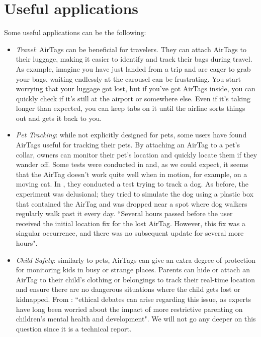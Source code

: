 \documentclass[english]{article}
\begin{document}
\section{Useful applications}\label{appl}
Some useful applications can be the following:
\begin{itemize}
  \item \textit{Travel}: AirTags can be beneficial for travelers. They can attach AirTags to their luggage, making it easier to identify and track their bags during travel. As example, 
  imagine you have just landed from a trip and are eager to grab your bags, waiting endlessly at the carousel can be frustrating. You start worrying that your luggage got lost, but if you've got AirTags inside, you can quickly check if it's still at the airport or somewhere else. Even if it's taking longer than expected, you can keep tabs on it until the airline sorts things out and gets it back to you.
  \item \textit{Pet Tracking}: while not explicitly designed for pets, some users have found AirTags useful for tracking their pets. By attaching an AirTag to a pet's collar, owners can monitor their pet's location and quickly locate them if they wander off. Some tests were conducted in \cite{KittyCatGO2024} and, as we could expect, it seems that the AirTag doesn’t work quite well when in motion, for example, on a moving cat. In \cite{Src2024}, they conducted a test trying to track a dog. As before, the experiment was delusional; they tried to simulate the dog using a plastic box that contained the AirTag and was dropped near a spot where dog walkers regularly walk past it every day. ``Several hours passed before the user received the initial location fix for the lost AirTag. However, this fix was a singular occurrence, and there was no subsequent update for several more hours".
  \item \textit{Child Safety}: similarly to pets, AirTags can give an extra degree of protection for monitoring kids in busy or strange places. Parents can hide or attach an AirTag to their child's clothing or belongings to track their real-time location and ensure there are no dangerous situations where the child gets lost or kidnapped. From \cite{Kelly_2023}: ``ethical debates can arise regarding this issue, as experts have long been worried about the impact of more restrictive parenting on children’s mental health and development". We will not go any deeper on this question since it is a technical report.

\end{itemize}
\end{document}
